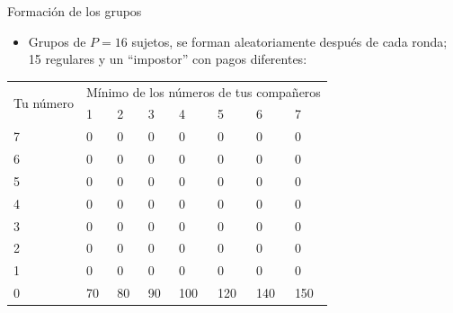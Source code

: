 \documentclass[t,9pt,xcolor=dvipsnames]{beamer}
\begin{document}
\begin{frame}{Formación de los grupos}
\begin{minipage}[c]{0.7\textwidth}
\begin{itemize}
  \item Grupos de $P=16$ sujetos, se forman aleatoriamente después de cada ronda; 15  regulares y un ``impostor'' con pagos diferentes:
    \end{itemize}
    \begin{table}[H]
    \centering
    \small
    
\begin{tabular}{l|lllllll}
\toprule
\multicolumn{1}{c}{\multirow{2}{*}{Tu número}} & \multicolumn{7}{c}{Mínimo de los números   de tus compañeros} \\\multicolumn{1}{c}{}                             & 1      & 2      & 3      & 4       & 5      & 6      & 7      \\ \midrule
7                                                & 0      & 0      & 0      & 0       & 0      & 0      & 0      \\
6                                                & 0      & 0      & 0      & 0       & 0      & 0      & 0      \\
5                                                & 0      & 0      & 0      & 0       & 0      & 0      & 0      \\
4                                                & 0      & 0      & 0      & 0       & 0      & 0      & 0      \\
3                                                & 0      & 0      & 0      & 0       & 0      & 0      & 0      \\
2                                                & 0      & 0      & 0      & 0       & 0      & 0      & 0      \\
1                                                & 0      & 0      & 0      & 0       & 0      & 0      & 0      \\
0                                                & 70     & 80     & 90     & 100     & 120    & 140    & 150   \\ \bottomrule
\end{tabular}
\end{table}
    \end{minipage}
    \hfill
    \begin{minipage}[c]{0.2 \textwidth}

\end{minipage}
\end{frame}
\end{document}
